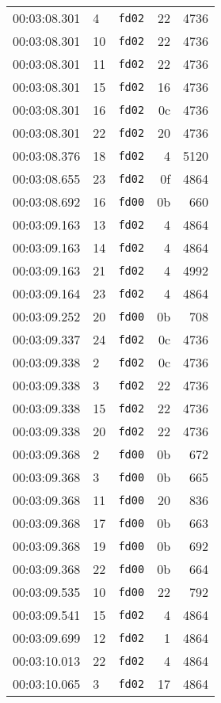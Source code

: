 \documentclass{article}
\begin{document}
\begin{longtable}{lllrr}
00:03:08.301 & 4 & \texttt{fd02} & 22 & 4736 \\
00:03:08.301 & 10 & \texttt{fd02} & 22 & 4736 \\
00:03:08.301 & 11 & \texttt{fd02} & 22 & 4736 \\
00:03:08.301 & 15 & \texttt{fd02} & 16 & 4736 \\
00:03:08.301 & 16 & \texttt{fd02} & 0c & 4736 \\
00:03:08.301 & 22 & \texttt{fd02} & 20 & 4736 \\
00:03:08.376 & 18 & \texttt{fd02} & 4 & 5120 \\
00:03:08.655 & 23 & \texttt{fd02} & 0f & 4864 \\
00:03:08.692 & 16 & \texttt{fd00} & 0b & 660 \\
00:03:09.163 & 13 & \texttt{fd02} & 4 & 4864 \\
00:03:09.163 & 14 & \texttt{fd02} & 4 & 4864 \\
00:03:09.163 & 21 & \texttt{fd02} & 4 & 4992 \\
00:03:09.164 & 23 & \texttt{fd02} & 4 & 4864 \\
00:03:09.252 & 20 & \texttt{fd00} & 0b & 708 \\
00:03:09.337 & 24 & \texttt{fd02} & 0c & 4736 \\
00:03:09.338 & 2 & \texttt{fd02} & 0c & 4736 \\
00:03:09.338 & 3 & \texttt{fd02} & 22 & 4736 \\
00:03:09.338 & 15 & \texttt{fd02} & 22 & 4736 \\
00:03:09.338 & 20 & \texttt{fd02} & 22 & 4736 \\
00:03:09.368 & 2 & \texttt{fd00} & 0b & 672 \\
00:03:09.368 & 3 & \texttt{fd00} & 0b & 665 \\
00:03:09.368 & 11 & \texttt{fd00} & 20 & 836 \\
00:03:09.368 & 17 & \texttt{fd00} & 0b & 663 \\
00:03:09.368 & 19 & \texttt{fd00} & 0b & 692 \\
00:03:09.368 & 22 & \texttt{fd00} & 0b & 664 \\
00:03:09.535 & 10 & \texttt{fd00} & 22 & 792 \\
00:03:09.541 & 15 & \texttt{fd02} & 4 & 4864 \\
00:03:09.699 & 12 & \texttt{fd02} & 1 & 4864 \\
00:03:10.013 & 22 & \texttt{fd02} & 4 & 4864 \\
00:03:10.065 & 3 & \texttt{fd02} & 17 & 4864 \\

\end{longtable}
\end{document}
